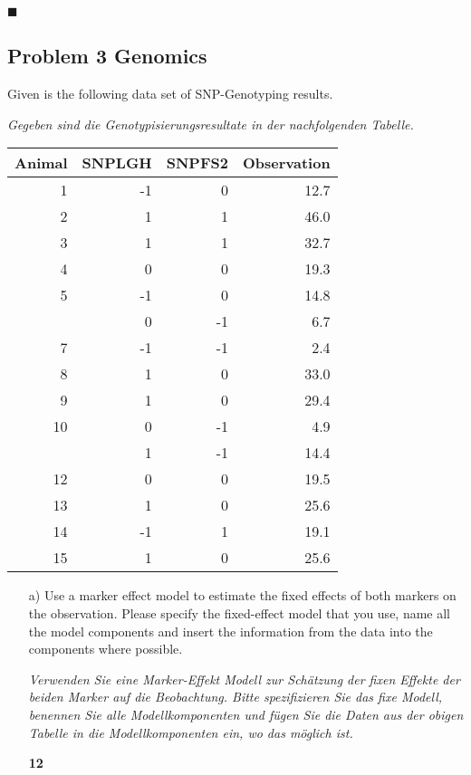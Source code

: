 \documentclass[
]{article}
\newcommand{\points}[1]
{\begin{flushright}\textbf{#1}\end{flushright}}
\newcommand{\solend}
{\vspace{2ex}$\blacksquare$}
\begin{document}
\solend

\clearpage
\pagebreak

\hypertarget{problem-3-genomics}{%
\subsection{Problem 3 Genomics}\label{problem-3-genomics}}

Given is the following data set of SNP-Genotyping results.

\textit{Gegeben sind die Genotypisierungsresultate in der nachfolgenden Tabelle.}

\begin{tabular}{rrrr}
\toprule
Animal & SNPLGH & SNPFS2 & Observation\\
\midrule
1 & -1 & 0 & 12.7\\
2 & 1 & 1 & 46.0\\
3 & 1 & 1 & 32.7\\
4 & 0 & 0 & 19.3\\
5 & -1 & 0 & 14.8\\
\addlinespace
6 & 0 & -1 & 6.7\\
7 & -1 & -1 & 2.4\\
8 & 1 & 0 & 33.0\\
9 & 1 & 0 & 29.4\\
10 & 0 & -1 & 4.9\\
\addlinespace
11 & 1 & -1 & 14.4\\
12 & 0 & 0 & 19.5\\
13 & 1 & 0 & 25.6\\
14 & -1 & 1 & 19.1\\
15 & 1 & 0 & 25.6\\
\bottomrule
\end{tabular}

\vspace{3ex}
\begin{enumerate}
\item[a)] Use a marker effect model to estimate the fixed effects of both markers on the observation. Please specify the fixed-effect model that you use, name all the model components and insert the information from the data into the components where possible. 

\textit{Verwenden Sie eine Marker-Effekt Modell zur Schätzung der fixen Effekte der beiden Marker auf die Beobachtung. Bitte spezifizieren Sie das fixe Modell, benennen Sie alle Modellkomponenten und fügen Sie die Daten aus der obigen Tabelle in die Modellkomponenten ein, wo das möglich ist.}
\points{12}
\end{enumerate}
\end{document}
